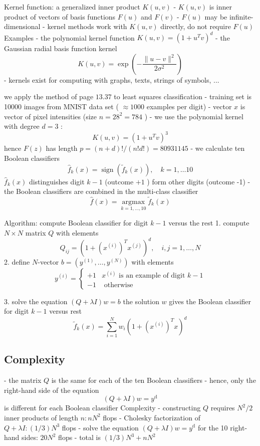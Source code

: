 Kernel function: a generalized inner product $ K(u, v) $
- $ K(u, v) $ is inner product of vectors of basis functions $ F(u) $ and $ F(v) $
- $ F(u) $ may be infinite-dimensional
- kernel methods work with $ K(u, v) $ directly, do not require $ F(u) $
Examples
- the polynomial kernel function $ K(u, v)=\left(1+u^{T} v\right)^{d} $
- the Gaussian radial basis function kernel
$$
K(u, v)=\exp \left(-\frac{\|u-v\|^{2}}{2 \sigma^{2}}\right)
$$
- kernels exist for computing with graphs, texts, strings of symbols, ...

we apply the method of page $ 13.37 $ to least squares classification
- training set is 10000 images from MNIST data set ( $ \approx 1000 $ examples per digit)
- vector $ x $ is vector of pixel intensities (size $ n=28^{2}=784 $ )
- we use the polynomial kernel with degree $ d=3 $ :
$$
K(u, v)=\left(1+u^{T} v\right)^{3}
$$
hence $ F(z) $ has length $ p=(n+d) ! /(n ! d !)=80931145 $
- we calculate ten Boolean classifiers
$$
\hat{f}_{k}(x)=\operatorname{sign}\left(\tilde{f}_{k}(x)\right), \quad k=1, \ldots 10
$$
$ \hat{f}_{k}(x) $ distinguishes digit $ k-1 $ (outcome $ +1 $ ) form other digits (outcome -1)
- the Boolean classifiers are combined in the multi-class classifier
$$
\hat{f}(x)=\underset{k=1, \ldots, 10}{\operatorname{argmax}} \tilde{f}_{k}(x)
$$

Algorithm: compute Boolean classifier for digit $ k-1 $ versus the rest
1. compute $ N \times N $ matrix $ Q $ with elements
$$
Q_{i j}=\left(1+\left(x^{(i)}\right)^{T} x^{(j)}\right)^{d}, \quad i, j=1, \ldots, N
$$
2. define $ N $-vector $ b=\left(y^{(1)}, \ldots, y^{(N)}\right) $ with elements
$$
y^{(i)}=\left\{\begin{array}{ll}
+1 & x^{(i)} \text { is an example of digit } k-1 \\
-1 & \text { otherwise }
\end{array}\right.
$$

3. solve the equation $ (Q+\lambda I) w=b $
the solution $ w $ gives the Boolean classifier for digit $ k-1 $ versus rest
$$
\tilde{f}_{k}(x)=\sum_{i=1}^{N} w_{i}\left(1+\left(x^{(i)}\right)^{T} x\right)^{d}
$$

\subsection{Complexity}

- the matrix $ Q $ is the same for each of the ten Boolean classifiers
- hence, only the right-hand side of the equation
$$
(Q+\lambda I) w=y^{\mathrm{d}}
$$
is different for each Boolean classifier
Complexity
- constructing $ Q $ requires $ N^{2} / 2 $ inner products of length $ n: n N^{2} $ flops
- Cholesky factorization of $ Q+\lambda I:(1 / 3) N^{3} $ flops
- solve the equation $ (Q+\lambda I) w=y^{\mathrm{d}} $ for the 10 right-hand sides: $ 20 N^{2} $ flops
- total is $ (1 / 3) N^{3}+n N^{2} $